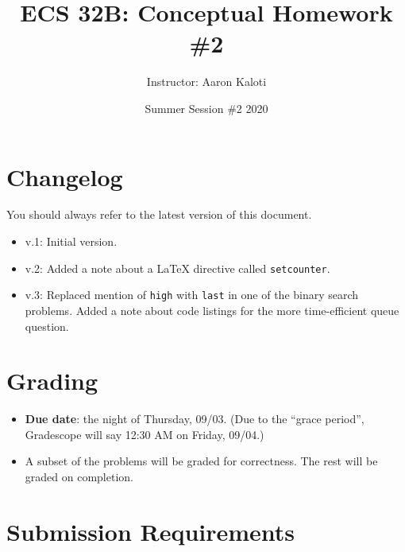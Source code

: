 \documentclass{article}
\title{ECS 32B: Conceptual Homework \#2}
\author{Instructor: Aaron Kaloti}
\date{Summer Session \#2 2020\blfootnote{This content is protected and may not be shared, uploaded, or distributed.}}
\begin{document}
\maketitle


\section{Changelog}

You should always refer to the latest version of this document.

\begin{itemize}[itemsep=0mm, parsep=0pt]
\item v.1: Initial version.
\item v.2: Added a note about a LaTeX directive called \lstinline{setcounter}.
\item v.3: Replaced mention of \lstinline{high} with \lstinline{last} in one of the binary search problems. Added a note about code listings for the more time-efficient queue question.
\end{itemize}

\section{Grading}

\begin{itemize}[itemsep=0mm, parsep=0pt]
\item \textbf{Due date}: the night of Thursday, 09/03. (Due to the ``grace period'', Gradescope will say 12:30 AM on Friday, 09/04.)
\item A subset of the problems will be graded for correctness. The rest will be graded on completion.
\end{itemize}

\section{Submission Requirements}
\end{document}
